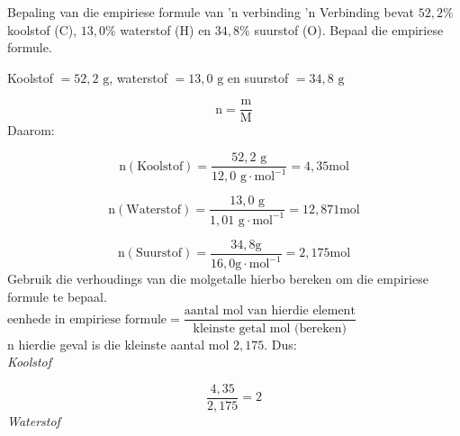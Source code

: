     \noindent
\label{m38712*secfhsst!!!underscore!!!id1029}
      \noindent 
      \begin{wex}{Bepaling van die empiriese formule van 'n verbinding}{
 'n Verbinding bevat $52,2\%$ koolstof ($\text{C}$), $13,0\%$ waterstof ($\text{H}$) en $34,8\%$ suurstof ($\text{O}$). Bepaal die empiriese formule.      
}
{ %
      \label{m38712*id280928}Koolstof $=52,2 \text{ g}$, waterstof $=13,0 \text{ g}$ en suurstof $=34,8 \text{ g}$ 
      \label{m38712*id280954}\nopagebreak\noindent{}
        
    \begin{equation*}
    \text{n}=\frac{\text{m}}{\text{M}}
      \end{equation*}
      \label{m38712*id280975}Daarom: 
      \label{m38712*id280978}\nopagebreak\noindent{}
        
    \begin{equation*}
    \text{n}\left(\text{Koolstof}\right)=\frac{52,2 \text{ g}}{12,0 \text{ g} \cdot \text{mol}^{-1}}=4,35\text{mol}
      \end{equation*}
      \label{m38712*id281042}\nopagebreak\noindent{}
        
    \begin{equation*}
    \text{n}\left(\text{Waterstof}\right)=\frac{13,0 \text{ g}}{1,01 \text{ g} \cdot \text{mol}^{-1}}=12,871\text{mol}
      \end{equation*}
      \label{m38712*id281111}\nopagebreak\noindent{}
        
    \begin{equation*}
    \text{n}\left(\text{Suurstof}\right)=\frac{34,8 \text{g}}{16,0 \text{g} \cdot \text{mol}^{-1}}=2,175\text{mol}
      \end{equation*}
Gebruik die verhoudings van die molgetalle hierbo bereken om die empiriese formule te bepaal.\\
$\text{eenhede in  empiriese formule} = \dfrac{\text{aantal mol van hierdie element}}{\text{kleinste getal mol (bereken)}}$\newline \\
n hierdie geval is die kleinste aantal mol $2,175$. Dus:\\ 
      \label{m38712*id281179}
        \textsl{Koolstof}
 
      \label{m38712*id281185}\nopagebreak\noindent{}
        
    \begin{equation*}
    \frac{4,35}{2,175}=2
      \end{equation*}
      \label{m38712*id281217}
        \textsl{Waterstof}
     
}
\end{wex}

